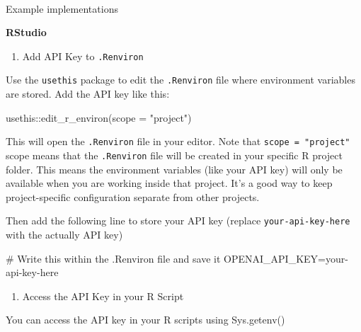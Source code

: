 \documentclass[
  letterpaper,
  DIV=11,
  numbers=noendperiod]{scrreprt}
\makeatletter
\let\oldparagraph\paragraph
\renewcommand{\paragraph}{
    \@ifstar
      \xxxParagraphStar
      \xxxParagraphNoStar
  }
\newcommand{\xxxParagraphStar}[1]{\oldparagraph*{#1}\mbox{}}
\newcommand{\xxxParagraphNoStar}[1]{\oldparagraph{#1}\mbox{}}
\newenvironment{Shaded}{\begin{snugshade}}{\end{snugshade}}
\newcommand{\AttributeTok}[1]{\textcolor[rgb]{0.40,0.45,0.13}{#1}}
\newcommand{\CommentTok}[1]{\textcolor[rgb]{0.37,0.37,0.37}{#1}}
\newcommand{\FunctionTok}[1]{\textcolor[rgb]{0.28,0.35,0.67}{#1}}
\newcommand{\NormalTok}[1]{\textcolor[rgb]{0.00,0.23,0.31}{#1}}
\newcommand{\OtherTok}[1]{\textcolor[rgb]{0.00,0.23,0.31}{#1}}
\newcommand{\SpecialCharTok}[1]{\textcolor[rgb]{0.37,0.37,0.37}{#1}}
\newcommand{\StringTok}[1]{\textcolor[rgb]{0.13,0.47,0.30}{#1}}
\providecommand{\tightlist}{%
  \setlength{\itemsep}{0pt}\setlength{\parskip}{0pt}}\usepackage{longtable,booktabs,array}
\makeatother
\begin{document}
\paragraph{Example implementations}\label{example-implementations}

\textbf{RStudio}

\begin{enumerate}
\def\labelenumi{\arabic{enumi}.}
\tightlist
\item
  Add API Key to \texttt{.Renviron}
\end{enumerate}

Use the \texttt{usethis} package to edit the \texttt{.Renviron} file
where environment variables are stored. Add the API key like this:

\begin{Shaded}
\begin{Highlighting}[]
\NormalTok{usethis}\SpecialCharTok{::}\FunctionTok{edit\_r\_environ}\NormalTok{(}\AttributeTok{scope =} \StringTok{"project"}\NormalTok{)}
\end{Highlighting}
\end{Shaded}

This will open the \texttt{.Renviron} file in your editor. Note that
\texttt{scope\ =\ "project"} scope means that the \texttt{.Renviron}
file will be created in your specific R project folder. This means the
environment variables (like your API key) will only be available when
you are working inside that project. It's a good way to keep
project-specific configuration separate from other projects.

Then add the following line to store your API key (replace
\texttt{your-api-key-here} with the actually API key)

\begin{Shaded}
\begin{Highlighting}[]
\CommentTok{\# Write this within the .Renviron file and save it}
\NormalTok{OPENAI\_API\_KEY}\OtherTok{=}\NormalTok{your}\SpecialCharTok{{-}}\NormalTok{api}\SpecialCharTok{{-}}\NormalTok{key}\SpecialCharTok{{-}}\NormalTok{here}
\end{Highlighting}
\end{Shaded}

\begin{enumerate}
\def\labelenumi{\arabic{enumi}.}
\setcounter{enumi}{1}
\tightlist
\item
  Access the API Key in your R Script
\end{enumerate}

You can access the API key in your R scripts using Sys.getenv()
\end{document}
